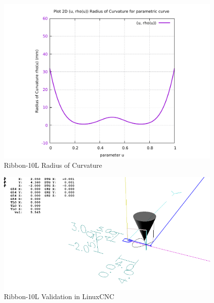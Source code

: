 \begin{figure}
	\caption     {Ribbon-10L Radius of Curvature}
	\label{02-img-Ribbon-10L Radius of Curvature.pdf}
	\includegraphics[width=1.00\textwidth]{Chap4/appendix/app-Ribbon-10L/plots/02-img-Ribbon-10L Radius of Curvature.pdf} 
\end{figure}	


\clearpage
\pagebreak

\begin{figure}
	\caption     {Ribbon-10L Validation in LinuxCNC}
	\label{03-img-Ribbon-10L-Validation-in-LinuxCNC.png}
	\includegraphics[width=1.00\textwidth]{Chap4/appendix/app-Ribbon-10L/plots/03-img-Ribbon-10L-Validation-in-LinuxCNC.png}
\end{figure}


